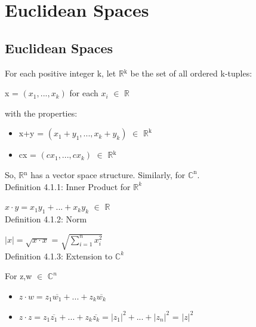 \newpage
\section[Day 4: Cauchy-Schwarz and Euclidean Spaces]{Euclidean Spaces}





\subsection{Euclidean Spaces}

	For each positive integer k, let $\mathbb{R}$$^\text{k}$ be the set of all ordered k-tuples:

	\qquad x = $(x_1,...,x_k)$	\qquad \qquad for each $x_i$ $\in$ $\mathbb{R}$

	with the properties:
	\begin{itemize}[leftmargin=1cm, itemsep=0.4em]
		\item x+y = $(x_1+y_1,...,x_k+y_k)$ $\in$ $\mathbb{R}^{\text{k}}$
	
		\item cx = $(cx_1,...,cx_k)$ $\in$ $\mathbb{R}$$^\text{k}$
	\end{itemize}

	So, $\mathbb{R}$$^\text{n}$ has a vector space structure. Similarly, for $\mathbb{C}^{\text{n}}$. \\


{ \color{blue} Definition 4.1.1: Inner Product for $\mathbb{R}^k$} 

	\qquad $x \cdot y = x_1y_1 + ... + x_ky_k$ $\in$ $\mathbb{R}$ \\

{ \color{blue} Definition 4.1.2: Norm }

	\qquad $|x| = \sqrt{x \cdot x}$ = $\sqrt{\sum_{i=1}^n x_i^2}$ \\

{ \color{blue} Definition 4.1.3: Extension to $\mathbb{C}^k$ } 

	\qquad For z,w $\in$ $\mathbb{C}^n$
	\begin{itemize}[leftmargin=2cm, itemsep=0.4em]
		\item $z \cdot w = z_1\overline{w_1} + ... + z_k\overline{w_k}$
	
		\item $z \cdot z = z_1\overline{z_1} + ... + z_k\overline{z_k}
			= |z_1|^2 + ... + |z_n|^2$ = $|z|^2$
	\end{itemize}





